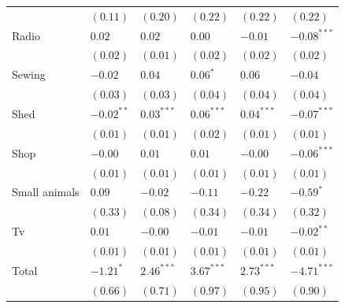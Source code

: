 \documentclass[12pt,letterpaper]{article}
\begin{document}
\begin{table}[htb]
\begin{tabular}{llllll}
 & \((0.11)\) & \((0.20)\) & \((0.22)\) & \((0.22)\) & \((0.22)\)\\
Radio & \(0.02\) & \(0.02\) & \(0.00\) & \(-0.01\) & \(-0.08^{***}\)\\
 & \((0.02)\) & \((0.01)\) & \((0.02)\) & \((0.02)\) & \((0.02)\)\\
Sewing & \(-0.02\) & \(0.04\) & \(0.06^{*}\) & \(0.06\) & \(-0.04\)\\
 & \((0.03)\) & \((0.03)\) & \((0.04)\) & \((0.04)\) & \((0.04)\)\\
Shed & \(-0.02^{**}\) & \(0.03^{***}\) & \(0.06^{***}\) & \(0.04^{***}\) & \(-0.07^{***}\)\\
 & \((0.01)\) & \((0.01)\) & \((0.02)\) & \((0.01)\) & \((0.01)\)\\
Shop & \(-0.00\) & \(0.01\) & \(0.01\) & \(-0.00\) & \(-0.06^{***}\)\\
 & \((0.01)\) & \((0.01)\) & \((0.01)\) & \((0.01)\) & \((0.01)\)\\
Small animals & \(0.09\) & \(-0.02\) & \(-0.11\) & \(-0.22\) & \(-0.59^{*}\)\\
 & \((0.33)\) & \((0.08)\) & \((0.34)\) & \((0.34)\) & \((0.32)\)\\
Tv & \(0.01\) & \(-0.00\) & \(-0.01\) & \(-0.01\) & \(-0.02^{**}\)\\
 & \((0.01)\) & \((0.01)\) & \((0.01)\) & \((0.01)\) & \((0.01)\)\\
\hline
Total & \(-1.21^{*}\) & \(2.46^{***}\) & \(3.67^{***}\) & \(2.73^{***}\) & \(-4.71^{***}\)\\
 & \((0.66)\) & \((0.71)\) & \((0.97)\) & \((0.95)\) & \((0.90)\)\\
\end{tabular}
\end{table}
\end{document}
